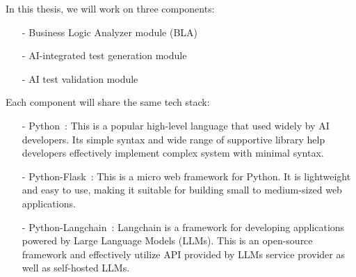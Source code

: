 
\hspace{0.2cm}In this thesis, we will work on three components:
\begin{itemize}
	\item[-] Business Logic Analyzer module (BLA)
	\item[-] AI-integrated test generation module
	\item[-] AI test validation module
\end{itemize}
\hspace{0.2cm}Each component will share the same tech stack:
\begin{itemize}
	\item[-] Python~\cite{PyMachineLearning}: This is a popular high-level language that used widely by AI developers. Its simple syntax and wide range of supportive library help developers effectively implement complex system with minimal syntax.
	\item[-] Python-Flask~\cite{flask}: This is a micro web framework for Python. It is lightweight and easy to use, making it suitable for building small to medium-sized web applications. 
	\item[-] Python-Langchain~\cite{langchain}: Langchain is a framework for developing applications powered by Large Language Models (LLMs). This is an open-source framework and effectively utilize API provided by LLMs service provider as well as self-hosted LLMs.
\end{itemize}

